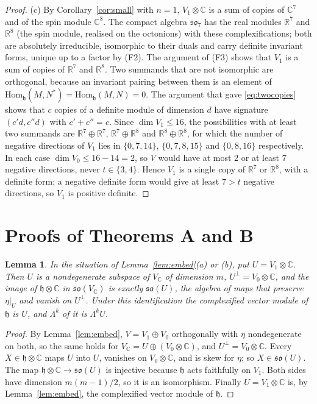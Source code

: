 \documentclass[11pt]{amsart}
\newtheorem{lemma}[theorem]{Lemma}
\theoremstyle{remark}
\newcommand{\so}{\mathfrak{so}}
\newcommand{\h}{\mathfrak{h}}
\newcommand{\R}{\mathbb{R}}
\newcommand{\C}{\mathbb{C}}
\begin{document}
\begin{proof}
(c) By Corollary~\ref{cor:small} with $n=1$, $V_1\otimes\C$ is a sum of copies of $\C^7$ and of the spin module $\C^8$. The compact algebra $\so_7$ has the real modules $\R^7$ and $\R^8$ (the spin module, realised on the octonions) with these complexifications; both are absolutely irreducible, isomorphic to their duals and carry definite invariant forms, unique up to a factor by (F2). The argument of (F3) shows that $V_1$ is a sum of copies of $\R^7$ and $\R^8$. Two summands that are not isomorphic are orthogonal, because an invariant pairing between them is an element of $\mathrm{Hom}_\h(M,N^*)=\mathrm{Hom}_\h(M,N)=0$. The argument that gave \eqref{eq:twocopies} shows that $c$ copies of a definite module of dimension $d$ have signature $(c'd,c''d)$ with $c'+c''=c$. Since $\dim V_1\le16$, the possibilities with at least two summands are $\R^7\oplus\R^7$, $\R^7\oplus\R^8$ and $\R^8\oplus\R^8$, for which the number of negative directions of $V_1$ lies in $\{0,7,14\}$, $\{0,7,8,15\}$ and $\{0,8,16\}$ respectively. In each case $\dim V_0\le 16-14=2$, so $V$ would have at most $2$ or at least $7$ negative directions, never $t\in\{3,4\}$. Hence $V_1$ is a single copy of $\R^7$ or $\R^8$, with a definite form; a negative definite form would give at least $7>t$ negative directions, so $V_1$ is positive definite.
\end{proof}
\section{Proofs of Theorems A and B}\label{sec:proofs}

\begin{lemma}\label{lem:image}
In the situation of Lemma~\ref{lem:embed}(a) or (b), put $U=V_1\otimes\C$. Then $U$ is a nondegenerate subspace of $V_\C$ of dimension $m$, $U^\perp=V_0\otimes\C$, and the image of $\h\otimes\C$ in $\so(V_\C)$ is exactly $\so(U)$, the algebra of maps that preserve $\eta|_U$ and vanish on $U^\perp$. Under this identification the complexified vector module of $\h$ is $U$, and $\Lambda^k$ of it is $\Lambda^kU$.
\end{lemma}

\begin{proof}
By Lemma~\ref{lem:embed}, $V=V_1\oplus V_0$ orthogonally with $\eta$ nondegenerate on both, so the same holds for $V_\C=U\oplus(V_0\otimes\C)$, and $U^\perp=V_0\otimes\C$. Every $X\in\h\otimes\C$ maps $U$ into $U$, vanishes on $V_0\otimes\C$, and is skew for $\eta$; so $X\in\so(U)$. The map $\h\otimes\C\to\so(U)$ is injective because $\h$ acts faithfully on $V_1$. Both sides have dimension $m(m-1)/2$, so it is an isomorphism. Finally $U=V_1\otimes\C$ is, by Lemma~\ref{lem:embed}, the complexified vector module of $\h$.
\end{proof}
\end{document}
